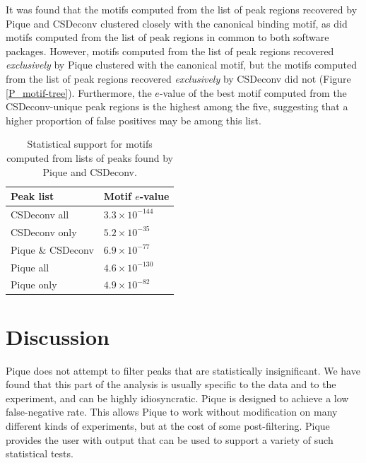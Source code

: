 It was found that the motifs computed from the list of peak regions
recovered by Pique and CSDeconv clustered closely with the canonical
binding motif, as did motifs computed from the list of peak regions in
common to both software packages. However, motifs computed from the
list of peak regions recovered {\em exclusively} by Pique clustered
with the canonical motif, but the motifs computed from the list of
peak regions recovered {\em exclusively} by CSDeconv did not
(Figure \ref{P_motif-tree}). Furthermore, the $e$-value of the best motif
computed from the CSDeconv-unique peak regions is the highest among
the five, suggesting that a higher proportion of false positives may
be among this list.

\begin{table}
  \begin{center}
    \begin{tabular}{ l l }
      Peak list & Motif $e$-value \\
      \hline
      CSDeconv all      & $3.3 \times 10^{-144}$ \\
      CSDeconv only     & $5.2 \times 10^{-35}$ \\
      Pique \& CSDeconv & $6.9 \times 10^{-77}$ \\
      Pique all         & $4.6 \times 10^{-130}$ \\
      Pique only        & $4.9 \times 10^{-82}$ \\
    \end{tabular}
  \end{center}
  \caption{Statistical support for motifs computed from lists of peaks 
    found by Pique and CSDeconv.}
\end{table}



\section{Discussion}

Pique does not attempt to filter peaks that are statistically
insignificant. We have found that this part of the analysis is usually
specific to the data and to the experiment, and can be highly
idiosyncratic. Pique is designed to achieve a low false-negative
rate. This allows Pique to work without modification on many different
kinds of experiments, but at the cost of some post-filtering. Pique
provides the user with output that can be used to support a variety of
such statistical tests.


